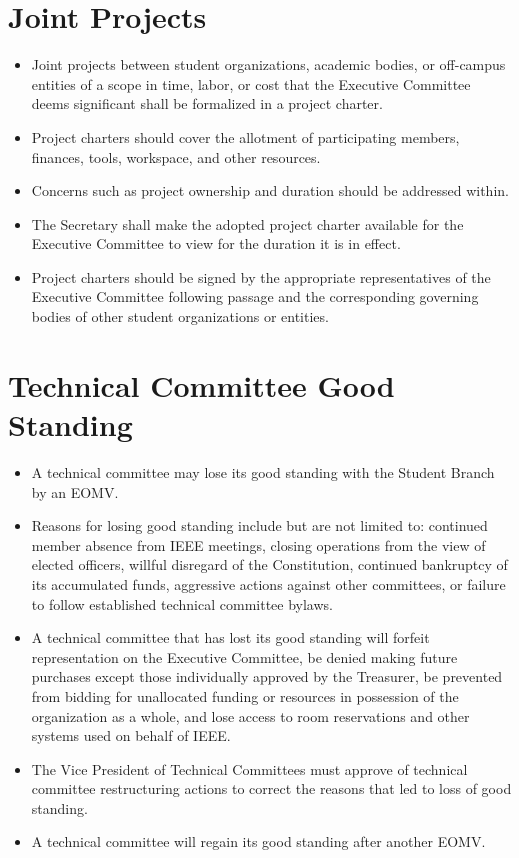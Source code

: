 \documentclass[12pt]{constitution}
\begin{document}
\section{Joint Projects}
\label{sec:tech_joint}
\begin{itemize}
    \item Joint projects between student organizations, academic bodies, or off-campus entities of a scope in time, labor, or cost that the Executive Committee deems significant shall be formalized in a project charter.
    \item Project charters should cover the allotment of participating members, finances, tools, workspace, and other resources.
    \item Concerns such as project ownership and duration should be addressed within.
    \item The Secretary shall make the adopted project charter available for the Executive Committee to view for the duration it is in effect.
    \item Project charters should be signed by the appropriate representatives of the Executive Committee following passage and the corresponding governing bodies of other student organizations or entities.
\end{itemize}

\section{Technical Committee Good Standing}
\label{sec:tech_goodstand}
\begin{itemize}
    \item A technical committee may lose its good standing with the Student Branch by an EOMV.
    \item Reasons for losing good standing include but are not limited to: continued member absence from IEEE meetings, closing operations from the view of elected officers, willful disregard of the Constitution, continued bankruptcy of its accumulated funds, aggressive actions against other committees, or failure to follow established technical committee bylaws.
    \item A technical committee that has lost its good standing will forfeit representation on the Executive Committee, be denied making future purchases except those individually approved by the Treasurer, be prevented from bidding for unallocated funding or resources in possession of the organization as a whole, and lose access to room reservations and other systems used on behalf of IEEE.
    \item The Vice President of Technical Committees must approve of technical committee restructuring actions to correct the reasons that led to loss of good standing.
    \item A technical committee will regain its good standing after another EOMV.
\end{itemize}
\end{document}
